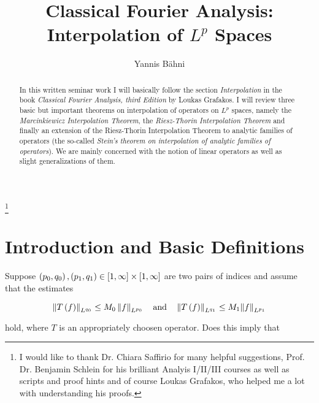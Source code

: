 




\begin{abstract}
	In this written seminar work I will basically follow the section \emph{Interpolation} in the book \emph{Classical Fourier Analysis, third Edition} by Loukas Grafakos. I will review three basic but important theorems on interpolation of operators on $L^p$ spaces, namely the \emph{Marcinkiewicz Interpolation Theorem}, the \emph{Riesz-Thorin Interpolation Theorem} and finally an extension of the Riesz-Thorin Interpolation Theorem to analytic families of operators (the so-called \emph{Stein's theorem on interpolation of analytic families of operators}). We are mainly concerned with the notion of linear operators as well as slight generalizations of them. 
\end{abstract}

\title{Classical Fourier Analysis: Interpolation of $L^p$ Spaces}
\author{Yannis B\"{a}hni}
\address[Yannis B\"{a}hni]{University of Zurich, R\"{a}mistrasse 71, 8006 Zurich}
\thanks{I would like to thank Dr. Chiara Saffirio for many helpful suggestions, Prof. Dr. Benjamin Schlein for his brilliant Analyis I/II/III courses as well as scripts and proof hints and of course Loukas Grafakos, who helped me a lot with understanding his proofs.}
\maketitle

\tableofcontents
\listoffigures

\mainsectionstyle

\section{Introduction and Basic Definitions}
Suppose $\del{p_0,q_0},\del{ p_1,q_1} \in \intcc{1,\infty} \times \intcc{1,\infty}$ are two pairs of indices and assume that the estimates 

\begin{equation*}
	\norm[0]{T\del{f}}_{L^{q_0}} \leq M_0 \norm[0]{f}_{L^{p_0}} \quad \text{and} \quad \norm[0]{T\del{f}}_{L^{q_1}} \leq M_1\norm{f}_{L^{p_1}}
\end{equation*}

\noindent hold, where $T$ is an appropriately choosen operator. Does this imply that

